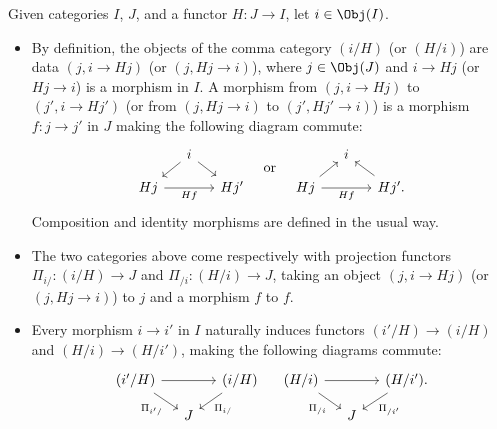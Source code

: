 \begin{definition}\label{def:comma-category}
	Given categories $I$, $J$, and a functor $H: J \to I$, let
	$i \in \Obj(I)$.
	\begin{itemize}
		\item By definition, the objects of the comma category $(i/H)$ (or
		$(H/i)$) are data $(j, i \to Hj)$ (or $(j, Hj \to i)$), where
		$j \in \Obj(J)$ and $i \to Hj$ (or $Hj \to i$) is a morphism in $I$.
		A morphism from $(j, i \to Hj)$ to $(j', i \to Hj')$ (or from
		$(j, Hj \to i)$ to $(j', Hj' \to i)$) is a morphism $f: j \to j'$ in
		$J$ making the following diagram commute:
		\[\begin{tikzcd}[row sep=small, column sep=small]
			& i \arrow[ld] \arrow[rd] & \\
			Hj \arrow[rr, "{Hf}"'] & & Hj'
		\end{tikzcd} \quad \text{or} \quad \begin{tikzcd}[row sep=small, column sep=small]
			& i & \\
			Hj \arrow[ru] \arrow[rr, "{Hf}"'] & & Hj' \arrow[lu] .
		\end{tikzcd}\]
		Composition and identity morphisms are defined in the usual way.
		\item The two categories above come respectively with projection functors
		$\Pi_{i/}: (i/H) \to J$ and $\Pi_{/i}: (H/i) \to J$, taking an object
		$(j, i \to Hj)$ (or $(j, Hj \to i)$) to $j$ and a morphism $f$ to $f$.
		\item Every morphism $i \to i'$ in $I$ naturally induces functors
		$(i'/H) \to (i/H)$ and $(H/i) \to (H/i')$, making the following
		diagrams commute:
		\[\begin{tikzcd}[column sep=small, row sep=small]
			(i'/H) \arrow[rr] \arrow[rd, "{\Pi_{i'/}}"'] & & (i/H) \arrow[ld, "{\Pi_{i/}}"] \\
			& J &
		\end{tikzcd} \quad \begin{tikzcd}[column sep=small, row sep=small]
			(H/i) \arrow[rr] \arrow[rd, "{\Pi_{/i}}"'] & & (H/i') \arrow[ld, "{\Pi_{/i'}}"] . \\
			& J &
		\end{tikzcd}\]
	\end{itemize}
\end{definition}

